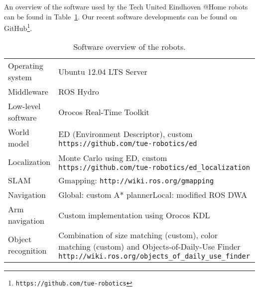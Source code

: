 An overview of the software used by the Tech United Eindhoven @Home robots can be found in Table~\ref{tab:softwarespec}. Our recent software developments can be found on GitHub\footnote{\texttt{https://github.com/tue-robotics}}.
\begin{table}[H]
    \begin{center}
    \caption{Software overview of the robots.}
    \label{tab:softwarespec}
    \vspace{-0.25cm}
    \renewcommand{\arraystretch}{1.0}
    \setlength{\tabcolsep}{5pt}
        \begin{tabular}{p{} p{}}
        	\toprule
            Operating system & Ubuntu 12.04 LTS Server\\
            
            Middleware & ROS Hydro\\
            
            Low-level software & Orocos Real-Time Toolkit\\
            
            World model & ED (Environment Descriptor), custom \newline \texttt{https://github.com/tue-robotics/ed}\\
            
            Localization & Monte Carlo using ED, custom \newline \texttt{https://github.com/tue-robotics/ed\_localization}\\
            
            SLAM & Gmapping: \texttt{http://wiki.ros.org/gmapping}\\
            
            Navigation & Global: custom A* planner\newline Local: modified ROS DWA\\
            
            Arm navigation & Custom implementation using Orocos KDL\\
            
            Object recognition & Combination of size matching (custom), color matching (custom) and Objects-of-Daily-Use Finder \newline \texttt{http://wiki.ros.org/objects\_of\_daily\_use\_finder} \\
            

\end{tabular}
\end{center}
\end{table}

